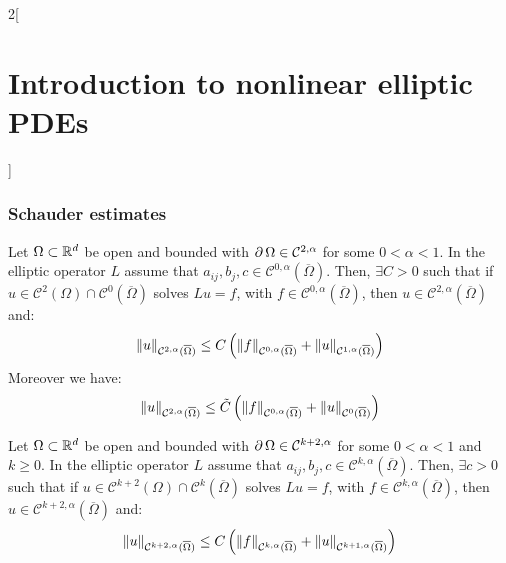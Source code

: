 \documentclass[../../../main_math.tex]{subfiles}
\begin{document}
\begin{multicols}{2}[\section{Introduction to nonlinear elliptic PDEs}]
  \subsubsection{Schauder estimates}
  \begin{theorem}\label{INEPDE:schauder_estimates}
    Let $\Omega\subset \mathbb{R}^d$ be open and bounded with $\operatorname{\partial}{\Omega}\in\mathcal{C}^{2,\alpha}$ for some $0<\alpha<1$. In the elliptic operator $L$ assume that $a_{ij},b_j,c\in\mathcal{C}^{0,\alpha}(\overline{\Omega})$. Then, $\exists C>0$ such that if $u\in\mathcal{C}^2(\Omega)\cap \mathcal{C}^0(\overline{\Omega})$ solves $Lu=f$, with $f\in\mathcal{C}^{0,\alpha}(\overline{\Omega})$, then $u\in \mathcal{C}^{2,\alpha}(\overline{\Omega})$ and:
    $$
      \left\|u\right\|_{\mathcal{C}^{2,\alpha}(\overline{\Omega})}\leq C\left(\left\|f\right\|_{\mathcal{C}^{0,\alpha}(\overline{\Omega})}+\left\|u\right\|_{\mathcal{C}^{1,\alpha}(\overline{\Omega})}\right)
    $$
    Moreover we have:
    $$
      \left\|u\right\|_{\mathcal{C}^{2,\alpha}(\overline{\Omega})}\leq \tilde{C}\left(\left\|f\right\|_{\mathcal{C}^{0,\alpha}(\overline{\Omega})}+\left\|u\right\|_{\mathcal{C}^{0}(\overline{\Omega})}\right)
    $$
  \end{theorem}
  \begin{corollary}
    Let $\Omega\subset \mathbb{R}^d$ be open and bounded with $\operatorname{\partial}{\Omega}\in\mathcal{C}^{k+2,\alpha}$ for some $0<\alpha<1$ and $k\geq 0$. In the elliptic operator $L$ assume that $a_{ij},b_j,c\in\mathcal{C}^{k,\alpha}(\overline{\Omega})$. Then, $\exists c>0$ such that if $u\in\mathcal{C}^{k+2}(\Omega)\cap \mathcal{C}^k(\overline{\Omega})$ solves $Lu=f$, with $f\in\mathcal{C}^{k,\alpha}(\overline{\Omega})$, then $u\in \mathcal{C}^{k+2,\alpha}(\overline{\Omega})$ and:
    $$
      \left\|u\right\|_{\mathcal{C}^{k+2,\alpha}(\overline{\Omega})}\leq C\left(\left\|f\right\|_{\mathcal{C}^{k,\alpha}(\overline{\Omega})}+\left\|u\right\|_{\mathcal{C}^{k+1,\alpha}(\overline{\Omega})}\right)
    $$
  \end{corollary}

\end{multicols}
\end{document}
